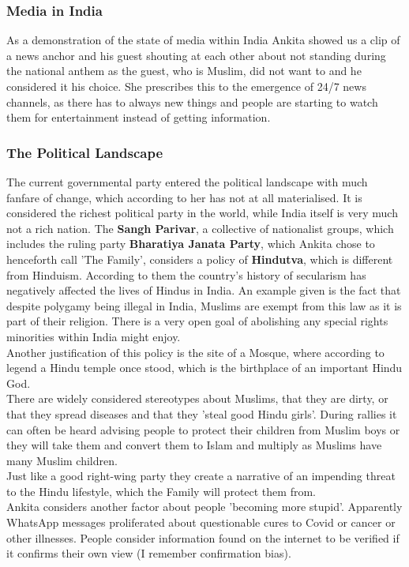 \documentclass{article}
\begin{document}
	\subsubsection{Media in India}
	As a demonstration of the state of media within India Ankita showed us a clip of a news anchor and his guest shouting at each other about not standing during the national anthem as the guest, who is Muslim, did not want to and he considered it his choice. She prescribes this to the emergence of 24/7 news channels, as there has to always new things and people are starting to watch them for entertainment instead of getting information. \\
	\subsubsection{The Political Landscape}
	The current governmental party entered the political landscape with much fanfare of change, which according to her has not at all materialised. It is considered the richest political party in the world, while India itself is very much not a rich nation. The \textbf{Sangh Parivar}, a collective of nationalist groups, which includes the ruling party \textbf{Bharatiya Janata Party}, which Ankita chose to henceforth call 'The Family', considers a policy of \textbf{Hindutva}, which is different from Hinduism. According to them the country's history of secularism has negatively affected the lives of Hindus in India. An example given is the fact that despite polygamy being illegal in India, Muslims are exempt from this law as it is part of their religion. There is a very open goal of abolishing any special rights minorities within India might enjoy. \\
	Another justification of this policy is the site of a Mosque, where according to legend a Hindu temple once stood, which is the birthplace of an important Hindu God. \\
	There are widely considered stereotypes about Muslims, that they are dirty, or that they spread diseases and that they 'steal good Hindu girls'. During rallies it can often be heard advising people to protect their children from Muslim boys or they will take them and convert them to Islam and multiply as Muslims have many Muslim children. \\
	Just like a good right-wing party they create a narrative of an impending threat to the Hindu lifestyle, which the Family will protect them from. \\
	Ankita considers another factor about people 'becoming more stupid'. Apparently WhatsApp messages proliferated about questionable cures to Covid or cancer or other illnesses. People consider information found on the internet to be verified if it confirms their own view (I remember confirmation bias).
\end{document}
